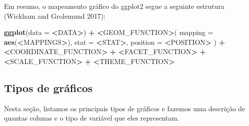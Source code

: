 \documentclass[
]{article}
\newenvironment{Shaded}{\begin{snugshade}}{\end{snugshade}}
\newcommand{\AttributeTok}[1]{\textcolor[rgb]{0.13,0.29,0.53}{#1}}
\newcommand{\ErrorTok}[1]{\textcolor[rgb]{0.64,0.00,0.00}{\textbf{#1}}}
\newcommand{\FunctionTok}[1]{\textcolor[rgb]{0.13,0.29,0.53}{\textbf{#1}}}
\newcommand{\NormalTok}[1]{#1}
\newcommand{\SpecialCharTok}[1]{\textcolor[rgb]{0.81,0.36,0.00}{\textbf{#1}}}
\begin{document}
Em resumo, o mapeamento gráfico do ggplot2 segue a seguinte estrutura (Wickham and Grolemund 2017):

\begin{Shaded}
\begin{Highlighting}[]
\FunctionTok{ggplot}\NormalTok{(}\AttributeTok{data =} \SpecialCharTok{\textless{}}\NormalTok{DATA}\SpecialCharTok{\textgreater{}}\NormalTok{) }\SpecialCharTok{+} 
    \ErrorTok{\textless{}}\NormalTok{GEOM\_FUNCTION}\SpecialCharTok{\textgreater{}}\NormalTok{(}
        \AttributeTok{mapping =} \FunctionTok{aes}\NormalTok{(}\SpecialCharTok{\textless{}}\NormalTok{MAPPINGS}\SpecialCharTok{\textgreater{}}\NormalTok{),}
        \AttributeTok{stat =} \SpecialCharTok{\textless{}}\NormalTok{STAT}\SpecialCharTok{\textgreater{}}\NormalTok{, }
        \AttributeTok{position =} \SpecialCharTok{\textless{}}\NormalTok{POSITION}\SpecialCharTok{\textgreater{}}
\NormalTok{        ) }\SpecialCharTok{+}
    \ErrorTok{\textless{}}\NormalTok{COORDINATE\_FUNCTION}\SpecialCharTok{\textgreater{}} \SpecialCharTok{+}
    \ErrorTok{\textless{}}\NormalTok{FACET\_FUNCTION}\SpecialCharTok{\textgreater{}} \SpecialCharTok{+}
    \ErrorTok{\textless{}}\NormalTok{SCALE\_FUNCTION}\SpecialCharTok{\textgreater{}} \SpecialCharTok{+}
    \ErrorTok{\textless{}}\NormalTok{THEME\_FUNCTION}\SpecialCharTok{\textgreater{}}
\end{Highlighting}
\end{Shaded}

\hypertarget{tipos-de-gruxe1ficos}{%
\subsection{Tipos de gráficos}\label{tipos-de-gruxe1ficos}}

Nesta seção, listamos os principais tipos de gráficos e fazemos uma descrição de quantas colunas e o tipo de variável que eles representam.
\end{document}
